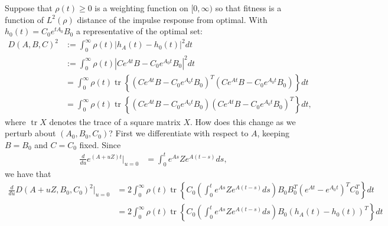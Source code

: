 \documentclass{article}
\newcommand{\tr}{\mathop{\mbox{tr}}} %
\newcommand{\1}{\mathbbm{1}}
\begin{document}
Suppose that $\rho(t) \ge 0$ is a weighting function on $[0,\infty)$
so that fitness is a function of $L^2(\rho)$ distance of the impulse response from optimal.
With $h_0(t) = C_0 e^{tA_0} B_0$ a representative of the optimal set:
\begin{equation}
    \begin{aligned}
        D(A, B, C)^2
        &:= 
        \int_0^\infty \rho(t) \left| h_A(t) - h_0(t) \right|^2 dt \\
        &:= 
        \int_0^\infty \rho(t) \left| C e^{At} B - C_0 e^{A_0 t} B_0 \right|^2 dt \\
        &= 
        \int_0^\infty \rho(t) \tr\left\{
            \left( C e^{At} B - C_0 e^{A_0 t} B_0 \right)^T
            \left( C e^{At} B - C_0 e^{A_0 t} B_0 \right)
        \right\} dt \\
        &= 
        \int_0^\infty \rho(t) \tr\left\{
            \left( C e^{At} B - C_0 e^{A_0 t} B_0 \right)
            \left( C e^{At} B - C_0 e^{A_0 t} B_0 \right)^T
        \right\} dt  ,
    \end{aligned}
\end{equation}
where $\tr X$ denotes the trace of a square matrix $X$.
How does this change as we perturb about $(A_0, B_0, C_0)$?
First we differentiate with respect to $A$, keeping $B=B_0$ and $C=C_0$ fixed.
Since
\begin{equation}
  \begin{aligned}
      \frac{d}{du} e^{(A+uZ)t} \vert_{u=0}
      &=
      \int_0^t e^{As} Z e^{A(t-s)} ds, 
  \end{aligned}
\end{equation}
we have that
\begin{equation}
  \begin{aligned}
      \frac{d}{du} D(A+uZ,B_0,C_0)^2 \vert_{u=0}
      &=
        2 \int_0^\infty \rho(t) \tr\left\{ C_0 \left( \int_0^t e^{As} Z e^{A(t-s)} ds \right) B_0 B_0^T \left( e^{At} - e^{A_0 t} \right)^T C_0^T \right\} dt \\
      &=
        2 \int_0^\infty \rho(t) \tr\left\{ C_0 \left( \int_0^t e^{As} Z e^{A(t-s)} ds \right) B_0 \left( h_A(t) - h_0(t) \right)^T \right\} dt 
  \end{aligned}
\end{equation}
\end{document}
